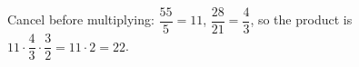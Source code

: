 Cancel before multiplying: $\dfrac{55}{5}=11$, $\dfrac{28}{21}=\dfrac{4}{3}$, so the product is $11\cdot\dfrac{4}{3}\cdot\dfrac{3}{2}=11\cdot2=\boxed{22}$.
